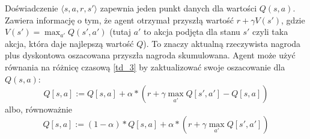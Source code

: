 \documentclass[a4paper, 12pt,twoside]{report}
\begin{document}
Doświadczenie $\langle s,a,r,s' \rangle$ zapewnia jeden punkt danych dla
wartości $Q(s,a)$. Zawiera informację o tym, że agent otrzymał przyszłą wartość
$r + \gamma V(s')$, gdzie $V(s') = \max_{a'}Q(s',a')$ (tutaj $a'$ to akcja
podjęta dla stanu $s'$ czyli taka akcja, która daje najlepszą wartość $Q$).
To znaczy aktualną rzeczywista nagroda plus dyskontowa
oszacowana przyszła nagroda skumulowana. Agent może użyć równania na różnicę
czasową \ref{td_3} by zaktualizować swoje oszacowanie dla $Q(s,a)$:
\begin{equation}
Q[s,a] := Q[s,a] + \alpha * \left(r + \gamma \max_{a'} Q[s',a'] -
Q[s,a]\right)
\label{qvalue_1}
\end{equation}
albo, równoważnie
\begin{equation}
Q[s,a] := (1 - \alpha) * Q[s,a] + \alpha * \left(r + \gamma \max_{a'}
Q[s',a'] \right)
\label{qvalue_2}
\end{equation}
\end{document}
